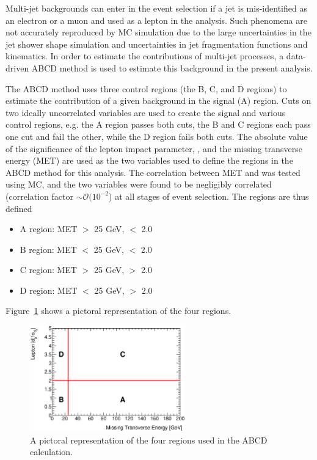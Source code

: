 \label{sec:multijet}
Multi-jet backgrounds can enter in the event selection if a jet %
is mis-identified as an electron or a muon and used as a lepton in the analysis. Such phenomena are not accurately reproduced by MC simulation due to the large uncertainties in the jet shower shape simulation and uncertainties in jet fragmentation functions and kinematics. In order to estimate the contributions of multi-jet processes, a data-driven ABCD method is used to estimate this background in the present analysis.

The ABCD method uses three control regions (the B, C, and D regions) to estimate the contribution of a given background in the signal (A) region. Cuts on two ideally
uncorrelated variables are used to create the signal and various control regions, e.g. the A region passes both cuts, the B and C regions each pass one cut and fail the other, while the D region fails both cuts. The absolute value of the significance of the lepton impact parameter, \dsig, and the missing transverse energy (MET) are used as the two variables used to define the regions in the ABCD method for this analysis. The correlation between MET and \dsig was tested using \ttbar MC, and the two variables were found to be negligibly correlated (correlation factor $\sim\mathcal{O}(10^{-2}$) at all stages of event selection. The regions are thus defined 
\begin{itemize}
\item A region: MET $>$ 25 GeV, \dsig $<$ 2.0
\item B region: MET $<$ 25 GeV, \dsig $<$ 2.0
\item C region: MET $>$ 25 GeV, \dsig $>$ 2.0
\item D region: MET $<$ 25 GeV, \dsig $>$ 2.0
\end{itemize}
Figure~\ref{fig:abcdCartoon} shows a pictoral representation of the four regions.
\begin{figure}[h!]
\begin{center}
\includegraphics[width=0.6\textwidth]{chapters/dihiggs2/figures/abcdExample_met_vs_d0sigBL20}
\end{center}
\label{fig:abcdCartoon}
\caption{A pictoral representation of the four regions used in the ABCD calculation.}
\end{figure}

